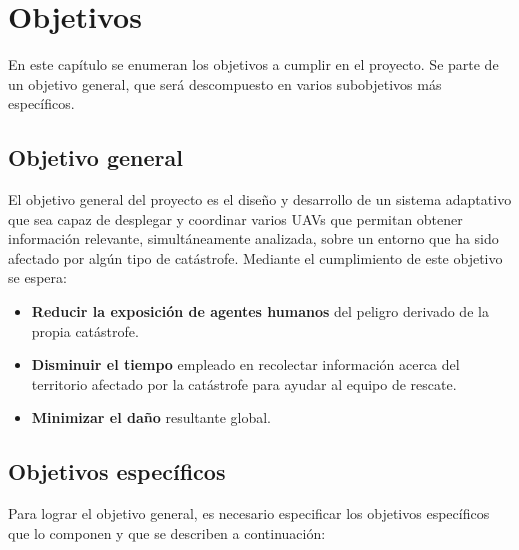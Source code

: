 \chapter{Objetivos}
\label{chap:objetivos}

En este capítulo se enumeran los objetivos a cumplir en el proyecto. Se parte de un objetivo general, que será descompuesto en varios subobjetivos más específicos.

\section{Objetivo general}
\label{sec:objetivogeneral}

El objetivo general del proyecto es el diseño y desarrollo de un sistema adaptativo que sea capaz de desplegar y coordinar varios \acs{UAV}s que permitan obtener información relevante, simultáneamente analizada, sobre un entorno que ha sido afectado por algún tipo de catástrofe. Mediante el cumplimiento de este objetivo se espera:

\begin{itemize}
\item \textbf{Reducir la exposición de agentes humanos} del peligro derivado de la propia catástrofe.
\item \textbf{Disminuir el tiempo} empleado en recolectar información acerca del territorio afectado por la catástrofe para ayudar al equipo de rescate.
\item \textbf{Minimizar el daño} resultante global.
\end{itemize}


\section{Objetivos específicos}
\label{sec:objetivoespecifico}
Para lograr el objetivo general, es necesario especificar los objetivos específicos que lo componen y que se describen a continuación:

